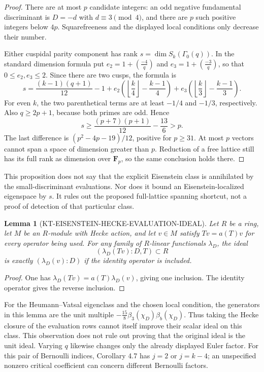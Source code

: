\documentclass[11pt,a4paper]{article}
\newtheorem{lemma}[theorem]{Lemma}
\theoremstyle{definition}
\begin{document}
\begin{proof}
There are at most $p$ candidate integers: an odd negative fundamental
discriminant is $D=-d$ with $d\equiv3\pmod4$, and there are $p$ such
positive integers below $4p$.  Squarefreeness and the displayed local
conditions only decrease their number.

Either cuspidal parity component has rank
$s=\dim S_k(\Gamma_0(q))$.  In the standard dimension formula put
$e_2=1+(\frac{-4}{q})$ and $e_3=1+(\frac{-3}{q})$, so that
$0\leq e_2,e_3\leq2$.  Since there are two cusps, the formula is
\[
 s=\frac{(k-1)(q+1)}{12}-1
   +e_2\left(\left\lfloor\frac{k}{4}\right\rfloor
                         -\frac{k-1}{4}\right)
   +e_3\left(\left\lfloor\frac{k}{3}\right\rfloor
                         -\frac{k-1}{3}\right).
\]
For even $k$, the two parenthetical terms are at least $-1/4$
and $-1/3$, respectively.  Also $q\geq2p+1$, because both primes
are odd.  Hence
\[
 s\geq\frac{(p+7)(p+1)}{12}-\frac{13}{6}>p.
\]
The last difference is $(p^2-4p-19)/12$, positive for $p\geq31$.
At most $p$ vectors cannot span a space of dimension greater than
$p$.  Reduction of a free lattice still has its full rank as
dimension over $\mathbf F_p$, so the same conclusion holds there.
\end{proof}

This proposition does not say that the explicit Eisenstein class is
annihilated by the small-discriminant evaluations.  Nor does it bound
an Eisenstein-localized eigenspace by $s$.  It rules out the proposed
full-lattice spanning shortcut, not a proof of detection of that
particular class.

\begin{lemma}[KT-EISENSTEIN-HECKE-EVALUATION-IDEAL]
Let $R$ be a ring, let $M$ be an $R$-module with Hecke action, and
let $v\in M$ satisfy $Tv=a(T)v$ for every operator being used.
For any family of $R$-linear functionals $\lambda_D$, the ideal
\[
 (\lambda_D(Tv):D,T)\subset R
\]
is exactly $(\lambda_D(v):D)$ if the identity operator is included.
\end{lemma}

\begin{proof}
One has $\lambda_D(Tv)=a(T)\lambda_D(v)$, giving one inclusion.
The identity operator gives the reverse inclusion.
\end{proof}

For the Heumann--Vatsal eigenclass and the chosen local condition,
the generators in this lemma are the unit multiple
$-\frac{15}{8}\beta_3(\chi_D)\beta_b(\chi_D)$.
Thus taking the Hecke closure of the evaluation rows cannot itself
improve their scalar ideal on this class.  This observation does
not rule out proving that the original ideal is the unit ideal.
Varying $q$ likewise changes only the already displayed Euler
factor.  For this pair of Bernoulli indices, Corollary 4.7 has
$j=2$ or $j=k-4$; an unspecified nonzero critical coefficient
can concern different Bernoulli factors.
\end{document}
